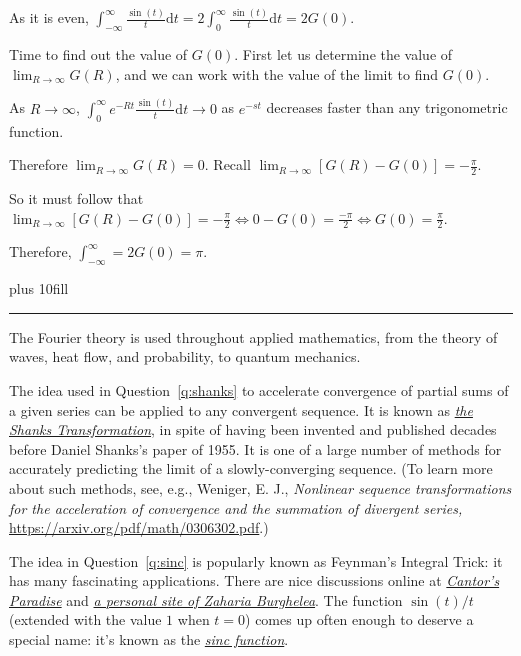 \documentclass[answers]{exam}
\begin{document}
\begin{questions}
\begin{parts}
\begin{solution}
    As it is even,  $\int^\infty_{-\infty} \frac{\sin(t)}{t} \mathrm dt = 2 \int^{\infty}_{0} \frac{\sin(t)}{t} \mathrm dt = 2G(0)$.

    Time to find out the value of $G(0)$. First let us determine the value of $\lim_{R \to \infty} G(R)$, and we can work with the value of the limit to find $G(0)$.

    As $R \to \infty$, $\int^\infty_{0} e^{-Rt} \frac{\sin(t)}{t} \mathrm dt \to 0$ as $e^{-st}$ decreases faster than any trigonometric function.
    
    Therefore $\lim_{R \to \infty} G(R) = 0$. Recall $\lim_{R \to \infty} \left[ G(R) - G(0) \right] = -\frac{\pi}{2}$. 
    
    So it must follow that $\lim_{R \to \infty} \left[ G(R) - G(0) \right] = -\frac{\pi}{2} \iff 0 - G(0) = \frac{-\pi}{2} \iff G(0) = \frac{\pi}{2}$.

    Therefore, $\int^{\infty}_{-\infty} = 2G(0) = \pi$.
\end{solution}


\end{parts}


\vskip 0pt plus 10fill
\clearpage

\end{questions}  %


\bigbreak\hrule\medskip


\noindent
The Fourier theory is used throughout applied mathematics,
from the theory of waves, heat flow, and probability, to
quantum mechanics.

The idea used in Question~\ref{q:shanks}
to accelerate convergence of partial
sums of a given series can be applied to any
convergent sequence.
It is known as 
\href{https://en.wikipedia.org/wiki/Shanks_transformation}{\emph{the Shanks Transformation}},
in spite of having been invented and published
decades before Daniel Shanks's paper of 1955.
It is one of a large number of methods for
accurately predicting the limit of a slowly-converging
sequence.
(To learn more about such methods, see, e.g.,
Weniger, E. J., 
\emph{Nonlinear sequence transformations for the
acceleration of convergence and the
summation of divergent series,}
\url{https://arxiv.org/pdf/math/0306302.pdf}.)

The idea in Question~\ref{q:sinc} is popularly known
as Feynman's Integral Trick: 
it has many fascinating applications.
There are nice discussions online at 
\href{https://www.cantorsparadise.org/richard-feynmans-integral-trick-e7afae85e25c/}{\emph{Cantor's Paradise}} and 
\href{https://zackyzz.github.io/feynman.html}{\emph{a personal site of Zaharia Burghelea}}.
The function $\sin(t)/t$ (extended with the value $1$ when $t=0$) comes up
often enough to deserve a special name: it's known as the \href{https://en.wikipedia.org/wiki/Sinc_function}{\emph{sinc function}}.
\end{document}
